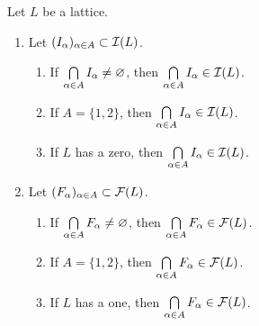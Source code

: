 \documentclass{book}
\begin{document}
	\begin{ex}
		Let $L$ be a lattice. 
		\begin{enumerate}
			\item Let $(I_{\alpha})_{\alpha \in A} \subset \mathcal{I}(L)$. 
			\begin{enumerate}
				\item If $\bigcap\limits_{\alpha \in A} I_{\alpha} \neq \varnothing$, then $\bigcap\limits_{\alpha \in A} I_{\alpha} \in \mathcal{I}(L)$. 
				\item If $A = \{1,2\}$, then $\bigcap\limits_{\alpha \in A} I_{\alpha} \in \mathcal{I}(L)$.
				\item If $L$ has a zero, then $\bigcap\limits_{\alpha \in A} I_{\alpha} \in \mathcal{I}(L)$.
			\end{enumerate}
			\item Let $(F_{\alpha})_{\alpha \in A} \subset \mathcal{F}(L)$. 
			\begin{enumerate}
				\item If $\bigcap\limits_{\alpha \in A} F_{\alpha} \neq \varnothing$, then $\bigcap\limits_{\alpha \in A} F_{\alpha} \in \mathcal{F}(L)$. 
				\item If $A = \{1,2\}$, then $\bigcap\limits_{\alpha \in A} F_{\alpha} \in \mathcal{F}(L)$.
				\item If $L$ has a one, then $\bigcap\limits_{\alpha \in A} F_{\alpha} \in \mathcal{F}(L)$. 
			\end{enumerate}
		\end{enumerate}
	\end{ex}
	
\end{document}
